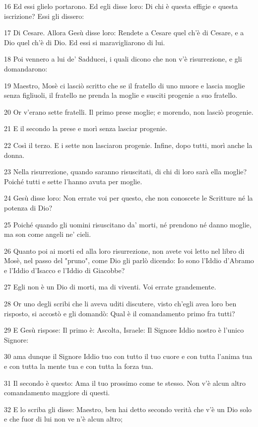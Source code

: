 \par 16 Ed essi glielo portarono. Ed egli disse loro: Di chi è questa effigie e questa iscrizione? Essi gli dissero:
\par 17 Di Cesare. Allora Gesù disse loro: Rendete a Cesare quel ch'è di Cesare, e a Dio quel ch'è di Dio. Ed essi si maravigliarono di lui.
\par 18 Poi vennero a lui de' Sadducei, i quali dicono che non v'è risurrezione, e gli domandarono:
\par 19 Maestro, Mosè ci lasciò scritto che se il fratello di uno muore e lascia moglie senza figliuoli, il fratello ne prenda la moglie e susciti progenie a suo fratello.
\par 20 Or v'erano sette fratelli. Il primo prese moglie; e morendo, non lasciò progenie.
\par 21 E il secondo la prese e morì senza lasciar progenie.
\par 22 Così il terzo. E i sette non lasciaron progenie. Infine, dopo tutti, morì anche la donna.
\par 23 Nella risurrezione, quando saranno risuscitati, di chi di loro sarà ella moglie? Poiché tutti e sette l'hanno avuta per moglie.
\par 24 Gesù disse loro: Non errate voi per questo, che non conoscete le Scritture né la potenza di Dio?
\par 25 Poiché quando gli uomini risuscitano da' morti, né prendono né danno moglie, ma son come angeli ne' cieli.
\par 26 Quanto poi ai morti ed alla loro risurrezione, non avete voi letto nel libro di Mosè, nel passo del "pruno", come Dio gli parlò dicendo: Io sono l'Iddio d'Abramo e l'Iddio d'Isacco e l'Iddio di Giacobbe?
\par 27 Egli non è un Dio di morti, ma di viventi. Voi errate grandemente.
\par 28 Or uno degli scribi che li aveva uditi discutere, visto ch'egli avea loro ben risposto, si accostò e gli domandò: Qual è il comandamento primo fra tutti?
\par 29 E Gesù rispose: Il primo è: Ascolta, Israele: Il Signore Iddio nostro è l'unico Signore:
\par 30 ama dunque il Signore Iddio tuo con tutto il tuo cuore e con tutta l'anima tua e con tutta la mente tua e con tutta la forza tua.
\par 31 Il secondo è questo: Ama il tuo prossimo come te stesso. Non v'è alcun altro comandamento maggiore di questi.
\par 32 E lo scriba gli disse: Maestro, ben hai detto secondo verità che v'è un Dio solo e che fuor di lui non ve n'è alcun altro;
